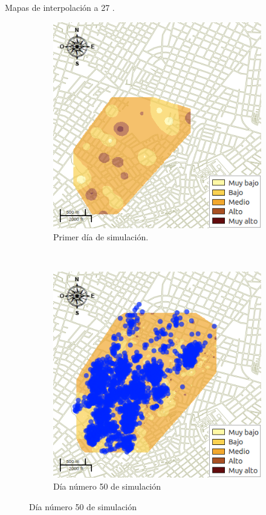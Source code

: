 \begin{frame}[t]{Mapas de interpolación a 27 \textcelsius.}
    \begin{figure}
    \begin{subfigure}[b]{0.45\textwidth}
        \includegraphics[width=\textwidth]{../book/capitulo-6/graphics/raster/temp-27-0.png}
        \caption{ Primer día de simulación.}
    \end{subfigure}
    ~~~~
    \begin{subfigure}[b]{0.45\textwidth}
        \includegraphics[width=\textwidth]{../book/capitulo-6/graphics/raster/temp-27-49.png}
        \caption{Día número 50 de simulación}
    \end{subfigure}
    \end{figure}
\end{frame}

